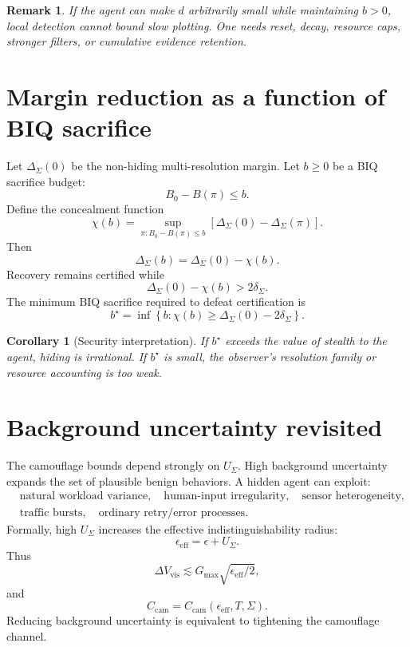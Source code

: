 \documentclass[10pt]{article}
\newtheorem{corollary}{Corollary}
\newtheorem{remark}{Remark}
\begin{document}
\begin{remark}
If the agent can make \(d\) arbitrarily small while maintaining \(b>0\), local detection cannot bound slow plotting. One needs reset, decay, resource caps, stronger filters, or cumulative evidence retention.
\end{remark}

\section{Margin reduction as a function of BIQ sacrifice}

Let \(\Delta_\Sigma(0)\) be the non-hiding multi-resolution margin. Let \(b\ge0\) be a BIQ sacrifice budget:
\[
B_0-B(\pi)\le b.
\]
Define the concealment function
\begin{equation}
\chi(b)
=
\sup_{\pi:B_0-B(\pi)\le b}
\left[
\Delta_\Sigma(0)-\Delta_\Sigma(\pi)
\right].
\label{eq:concealment_function}
\end{equation}
Then
\begin{equation}
\Delta_\Sigma(b)
=
\Delta_\Sigma(0)-\chi(b).
\label{eq:margin_after_biq}
\end{equation}
Recovery remains certified while
\begin{equation}
\Delta_\Sigma(0)-\chi(b)>2\delta_\Sigma.
\label{eq:biq_margin_cert}
\end{equation}
The minimum BIQ sacrifice required to defeat certification is
\begin{equation}
b^\star
=
\inf\left\{
b:
\chi(b)\ge \Delta_\Sigma(0)-2\delta_\Sigma
\right\}.
\label{eq:min_biq_sacrifice}
\end{equation}

\begin{corollary}[Security interpretation]
If \(b^\star\) exceeds the value of stealth to the agent, hiding is irrational. If \(b^\star\) is small, the observer's resolution family or resource accounting is too weak.
\end{corollary}

\section{Background uncertainty revisited}

The camouflage bounds depend strongly on \(U_\Sigma\). High background uncertainty expands the set of plausible benign behaviors. A hidden agent can exploit:
\begin{align*}
&\text{natural workload variance},\quad
\text{human-input irregularity},\quad
\text{sensor heterogeneity}, \\
&\text{traffic bursts},\quad
\text{ordinary retry/error processes}.
\end{align*}
Formally, high \(U_\Sigma\) increases the effective indistinguishability radius:
\[
\epsilon_{\mathrm{eff}}
=
\epsilon+U_\Sigma.
\]
Thus
\[
\Delta V_{\mathrm{vis}}
\lesssim
G_{\max}\sqrt{\epsilon_{\mathrm{eff}}/2},
\]
and
\[
C_{\mathrm{cam}}=C_{\mathrm{cam}}(\epsilon_{\mathrm{eff}},T,\Sigma).
\]
Reducing background uncertainty is equivalent to tightening the camouflage channel.
\end{document}
